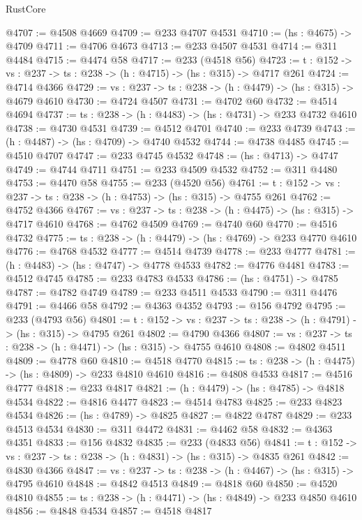 \begin{lexlean}{RustCore}
\begin{coremodule}
@4707 := @4508 @4669
@4709 := @233 @4707 @4531
@4710 := (hs : @4675) -> @4709
@4711 := @4706 @4673
@4713 := @233 @4507 @4531
@4714 := @311 @4484
@4715 := @4474 @58
@4717 := @233 (@4518 @56)
@4723 := {t : @152} -> {vs : @237} -> {ts : @238} -> (h : @4715) -> (hs : @315) -> @4717 @261
@4724 := @4714 @4366
@4729 := {vs : @237} -> {ts : @238} -> (h : @4479) -> (hs : @315) -> @4679 @4610
@4730 := @4724 @4507
@4731 := @4702 @60
@4732 := @4514 @4694
@4737 := {ts : @238} -> (h : @4483) -> (hs : @4731) -> @233 @4732 @4610
@4738 := @4730 @4531
@4739 := @4512 @4701
@4740 := @233 @4739
@4743 := (h : @4487) -> (hs : @4709) -> @4740 @4532
@4744 := @4738 @4485
@4745 := @4510 @4707
@4747 := @233 @4745 @4532
@4748 := (hs : @4713) -> @4747
@4749 := @4744 @4711
@4751 := @233 @4509 @4532
@4752 := @311 @4480
@4753 := @4470 @58
@4755 := @233 (@4520 @56)
@4761 := {t : @152} -> {vs : @237} -> {ts : @238} -> (h : @4753) -> (hs : @315) -> @4755 @261
@4762 := @4752 @4366
@4767 := {vs : @237} -> {ts : @238} -> (h : @4475) -> (hs : @315) -> @4717 @4610
@4768 := @4762 @4509
@4769 := @4740 @60
@4770 := @4516 @4732
@4775 := {ts : @238} -> (h : @4479) -> (hs : @4769) -> @233 @4770 @4610
@4776 := @4768 @4532
@4777 := @4514 @4739
@4778 := @233 @4777
@4781 := (h : @4483) -> (hs : @4747) -> @4778 @4533
@4782 := @4776 @4481
@4783 := @4512 @4745
@4785 := @233 @4783 @4533
@4786 := (hs : @4751) -> @4785
@4787 := @4782 @4749
@4789 := @233 @4511 @4533
@4790 := @311 @4476
@4791 := @4466 @58
@4792 := @4363 @4352
@4793 := @156 @4792
@4795 := @233 (@4793 @56)
@4801 := {t : @152} -> {vs : @237} -> {ts : @238} -> (h : @4791) -> (hs : @315) -> @4795 @261
@4802 := @4790 @4366
@4807 := {vs : @237} -> {ts : @238} -> (h : @4471) -> (hs : @315) -> @4755 @4610
@4808 := @4802 @4511
@4809 := @4778 @60
@4810 := @4518 @4770
@4815 := {ts : @238} -> (h : @4475) -> (hs : @4809) -> @233 @4810 @4610
@4816 := @4808 @4533
@4817 := @4516 @4777
@4818 := @233 @4817
@4821 := (h : @4479) -> (hs : @4785) -> @4818 @4534
@4822 := @4816 @4477
@4823 := @4514 @4783
@4825 := @233 @4823 @4534
@4826 := (hs : @4789) -> @4825
@4827 := @4822 @4787
@4829 := @233 @4513 @4534
@4830 := @311 @4472
@4831 := @4462 @58
@4832 := @4363 @4351
@4833 := @156 @4832
@4835 := @233 (@4833 @56)
@4841 := {t : @152} -> {vs : @237} -> {ts : @238} -> (h : @4831) -> (hs : @315) -> @4835 @261
@4842 := @4830 @4366
@4847 := {vs : @237} -> {ts : @238} -> (h : @4467) -> (hs : @315) -> @4795 @4610
@4848 := @4842 @4513
@4849 := @4818 @60
@4850 := @4520 @4810
@4855 := {ts : @238} -> (h : @4471) -> (hs : @4849) -> @233 @4850 @4610
@4856 := @4848 @4534
@4857 := @4518 @4817

\end{coremodule}
\end{lexlean}
